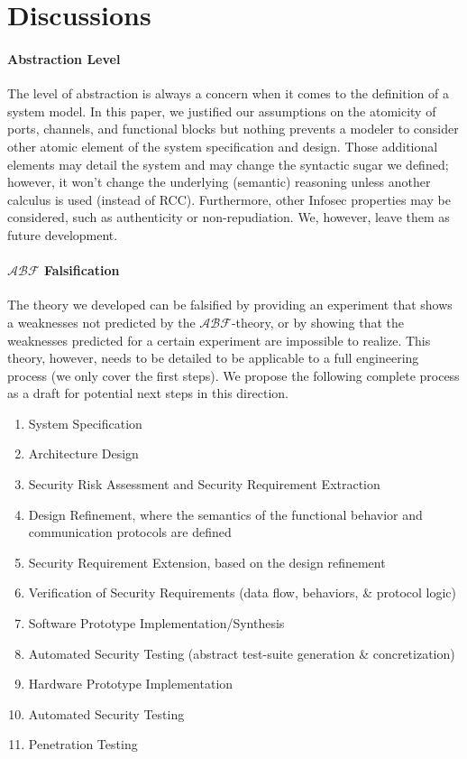 \documentclass[conference]{IEEEtran}
\newcommand{\assertionRegion}{\mathcal{A}}
\newcommand{\beliefRegion}{\mathcal{B}}
\newcommand{\factRegion}{\mathcal{F}}
\newcommand{\abftheory}{\assertionRegion\beliefRegion\factRegion}
\begin{document}
\section{Discussions}\label{sec:discussion}
\paragraph{Abstraction Level}
The level of abstraction is always a concern when it comes to the definition of
a system model.  In this paper, we justified our assumptions on the atomicity
of ports, channels, and functional blocks but nothing prevents a modeler to
consider other atomic element of the system specification and design.  Those
additional elements may detail the system and may change the syntactic sugar we
defined; however, it won't change the underlying (semantic) reasoning unless
another calculus is used (instead of RCC).  Furthermore, other Infosec
properties may be considered, such as authenticity or non-repudiation. We,
however, leave them as future development.

\paragraph{$\abftheory$ Falsification} The theory we developed can be falsified
by providing an experiment that shows a weaknesses not predicted by the
$\abftheory$-theory, or by showing that the weaknesses predicted for a certain
experiment are impossible to realize.  This theory, however, needs to be
detailed to be applicable to a full engineering process (we only cover the
first steps).  We propose the following complete process as a draft for
potential next steps in this direction.
\begin{enumerate}
\item System Specification
\item Architecture Design
\item Security Risk Assessment and Security Requirement Extraction
\item Design Refinement, where the semantics of the functional behavior and
	communication protocols are defined 
\item Security Requirement Extension, based on the design refinement
\item Verification of Security Requirements (data flow, behaviors, \& protocol
	logic)
\item Software Prototype Implementation/Synthesis
\item Automated Security Testing (abstract test-suite generation \&
	concretization)
\item Hardware Prototype Implementation
\item Automated Security Testing
\item Penetration Testing
  \end{enumerate}
\end{document}
